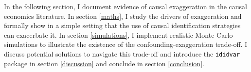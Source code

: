 			In the following section, I document evidence of causal exaggeration in the causal  economics literature. In section \ref{maths}, I study the drivers of exaggeration and formally show in a simple setting that the use of causal identification strategies can exacerbate it. In section  \ref{simulations}, I implement realistic Monte-Carlo simulations to illustrate the existence of the confounding-exaggeration trade-off. I discuss potential solutions to navigate this trade-off and introduce the \verb?ididvar? package in section \ref{discussion} and conclude in section \ref{conclusion}.
	
	
		
